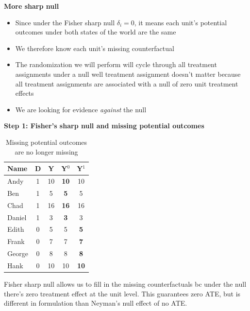 \documentclass[notes=show]{beamer}
\begin{document}
\begin{frame}[plain]
\begin{center}
\textbf{More sharp null}
\end{center}

\begin{itemize}
\item Since under the Fisher sharp null $\delta_i=0$, it means each unit's potential outcomes under both states of the world are the same
\item We therefore know each unit's missing counterfactual
\item The randomization we will perform will cycle through all treatment assignments under a null well treatment assignment doesn't matter because all treatment assignments are associated with a null of zero unit treatment effects
\item We are looking for evidence \emph{against} the null 
\end{itemize}

\end{frame}




\begin{frame}[plain]

\begin{center}
\textbf{Step 1: Fisher's sharp null and missing potential outcomes}
\end{center}

\begin{table}[htbp]\centering
\begin{center}
\caption{Missing potential outcomes are no longer missing}
\begin{threeparttable}
\begin{tabular}{lcccc}
\toprule
\multicolumn{1}{l}{Name}&
\multicolumn{1}{c}{D}&
\multicolumn{1}{c}{Y}&
\multicolumn{1}{c}{Y$^0$}&
\multicolumn{1}{c}{Y$^1$}\\
\midrule
Andy		& 1 & 10  & \textbf{10} & 10 \\
Ben		& 1 & 5    & \textbf{5} & 5 \\
Chad	& 1 & 16  & \textbf{16} & 16 \\	
Daniel	& 1 &  3   & \textbf{3} & 3 \\
Edith		& 0 & 5    & 5 & \textbf{5} \\
Frank	& 0 & 7    & 7& \textbf{7}  \\
George	& 0 & 8    & 8 & \textbf{8} \\
Hank		& 0 & 10  & 10 & \textbf{10} \\
\bottomrule
\end{tabular}
\end{threeparttable}
\end{center}
\end{table}

Fisher sharp null allows us to fill in the missing counterfactuals bc under the null there's zero treatment effect at the unit level. This guarantees zero ATE, but is different in formulation than Neyman's null effect of no  ATE.
	
\end{frame}
\end{document}
